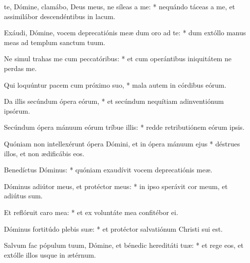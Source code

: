 \begin{psalmus}

		 te, Dómine, clamábo, Deus meus, ne síleas a me: * nequándo táceas a me, et assimilábor descendéntibus in lacum.

		Exáudi, Dómine, vocem deprecatiónis meæ dum oro ad te: * dum extóllo manus meas ad templum sanctum tuum.

		Ne simul trahas me cum peccatóribus: * et cum operántibus iniquitátem ne perdas me.

		Qui loquúntur pacem cum próximo suo, * mala autem in córdibus eórum.

		Da illis secúndum ópera eórum, * et secúndum nequítiam adinventiónum ipsórum.

		Secúndum ópera mánuum eórum tríbue illis: * redde retributiónem eórum ipsis.

		Quóniam non intellexérunt ópera Dómini, et in ópera mánuum ejus * déstrues illos, et non ædificábis eos.

		Benedíctus Dóminus: * quóniam exaudívit vocem deprecatiónis meæ.

		Dóminus adiútor meus, et protéctor meus: * in ipso sperávit cor meum, et adiútus sum.

		Et reflóruit caro mea: * et ex voluntáte mea confitébor ei.

		Dóminus fortitúdo plebis suæ: * et protéctor salvatiónum Christi sui est.

		Salvum fac pópulum tuum, Dómine, et bénedic hereditáti tuæ: * et rege eos, et extólle illos usque in ætérnum.

\end{psalmus}
